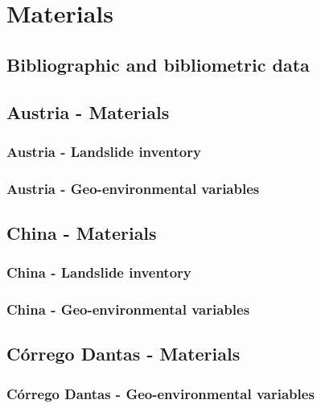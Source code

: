 \chapter{Materials} \label{Materials}	%
{\textcolor{red}{ \lipsum[1]}}

\section{Bibliographic and bibliometric data}\label{Materials - review}
{\textcolor{red}{ \lipsum[1]}}

\section{Austria - Materials}\label{Materials - Austria}
{\textcolor{red}{ \lipsum[1]}}

\subsection{Austria - Landslide inventory}\label{Landslide inventory}
{\textcolor{red}{ \lipsum[1]}}



\subsection{Austria - Geo-environmental variables}\label{Geo-environmental landslide predictors}
{\textcolor{red}{ \lipsum[1]}}

\section{China - Materials}\label{China - Materials}
{\textcolor{red}{ \lipsum[1]}}


\subsection{China - Landslide inventory}\label{China - Landslide inventory}
{\textcolor{red}{ \lipsum[1]}}

\subsection{China - Geo-environmental variables}\label{China - Geo-environmental landslide predictors}

{\textcolor{red}{ \lipsum[1]}}





\section{Córrego Dantas - Materials} \label{Córrego Dantas - Materials}
{\textcolor{red}{ \lipsum[1]}}


\subsection{Córrego Dantas - Geo-environmental variables}\label{Córrego Dantas - Geo-environmental landslide predictors}
{\textcolor{red}{ \lipsum[1]}}

\newpage
